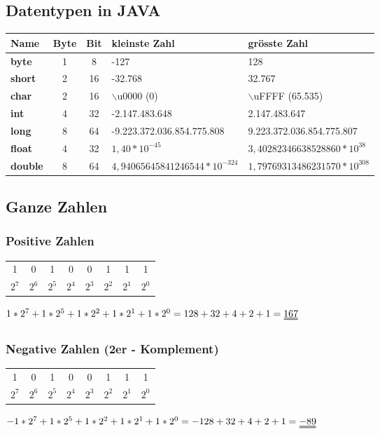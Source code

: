\documentclass[a4paper,10pt]{article}
\newcommand{\Bold}[1]{\textbf{#1}} %
\begin{document}
\subsection{Datentypen in JAVA}
\begin{tabular}{l c c l l}
	Name & Byte & Bit & kleinste Zahl & gr\"osste Zahl \\
	\hline
	\Bold {byte} & 1 & 8 & -127 & 128 \\
	\Bold {short} & 2 & 16 &-32.768 & 32.767 \\
	\Bold {char} & 2 & 16 & $\backslash$u0000 (0) & 	$\backslash$uFFFF (65.535) \\
	\Bold {int} & 4 & 32 & -2.147.483.648 & 2.147.483.647 \\
	\Bold {long} & 8 & 64 & -9.223.372.036.854.775.808 & 9.223.372.036.854.775.807 \\
	\Bold {float} & 4 & 32 & $1,40 * 10^{-45}$ & $3,40282346638528860 * 10^{38}$ \\
	\Bold {double} & 8 & 64 & $4,94065645841246544*10^{-324}$ & $1,79769313486231570*10^{308}$  \\
\end{tabular}

\subsection{Ganze Zahlen}

\subsubsection{Positive Zahlen}
\begin{tabular}{c c c c c c c c}
	1 & 0 & 1 & 0 & 0 & 1 & 1 & 1 \\
	$2^7$ & $2^6$ & $2^5$ & $2^4$ & $2^3$ & $2^2$ & $2^1$ & $2^0$
\end{tabular}
$1*2^7+1*2^5+1*2^2+1*2^1+1*2^0=128+32+4+2+1=\uuline{167}$

\subsubsection{Negative Zahlen (2er - Komplement)}
\begin{tabular}{c c c c c c c c}
	1 & 0 & 1 & 0 & 0 & 1 & 1 & 1 \\
	$2^7$ & $2^6$ & $2^5$ & $2^4$ & $2^3$ & $2^2$ & $2^1$ & $2^0$
\end{tabular} 
$-1*2^7+1*2^5+1*2^2+1*2^1+1*2^0=-128+32+4+2+1=\uuline{-89}$
\end{document}
